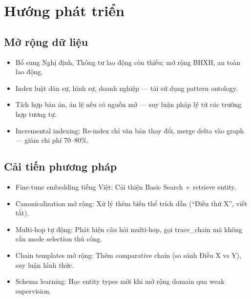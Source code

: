 \documentclass[../DoAn.tex]{subfiles}
\begin{document}
\section{Hướng phát triển}
\label{section:6.4}

\subsection{Mở rộng dữ liệu}
\label{subsection:6.4.1}

\begin{itemize}[nosep, leftmargin=*]
    \item Bổ sung Nghị định, Thông tư lao động còn thiếu; mở rộng BHXH, an toàn lao động.
    
    \item Index luật dân sự, hình sự, doanh nghiệp --- tái sử dụng pattern ontology.
    
    \item Tích hợp bản án, án lệ nếu có nguồn mở --- suy luận pháp lý từ các trường hợp tương tự.
    
    \item Incremental indexing: Re-index chỉ văn bản thay đổi, merge delta vào graph --- giảm chi phí 70--80\%.
\end{itemize}

\subsection{Cải tiến phương pháp}
\label{subsection:6.4.2}

\begin{itemize}[nosep, leftmargin=*]
    \item Fine-tune embedding tiếng Việt: Cải thiện Basic Search + retrieve entity.
    
    \item Canonicalization mở rộng: Xử lý thêm biến thể trích dẫn (``Điều thứ X'', viết tắt).
    
    \item Multi-hop tự động: Phát hiện câu hỏi multi-hop, gọi trace\_chain mà không cần mode selection thủ công.
    
    \item Chain templates mở rộng: Thêm comparative chain (so sánh Điều X vs Y), suy luận hình thức.
    
    \item Schema learning: Học entity types mới khi mở rộng domain qua weak supervision.
\end{itemize}
\end{document}
